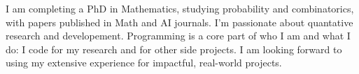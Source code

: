 \documentclass[11pt, letterpaper]{awesome-cv} %
\begin{document}
\makecvheader %



{\fontsize{9pt}{1em}\bodyfont\color{darktext} I am completing a PhD in Mathematics, studying probability and combinatorics, with papers published in Math and AI journals. I'm passionate about quantative research and developement. Programming is a core part of who I am and what I do: I code for my research and for other side projects. I am looking forward to using my extensive experience for impactful, real-world projects.}




% 

% 

% 
\end{document}
